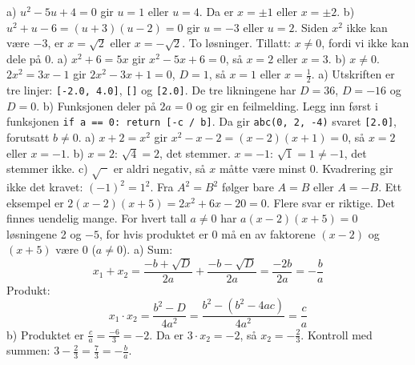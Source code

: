  a) $u^2 - 5u + 4 = 0$ gir $u = 1$ eller $u = 4$. Da er $x = \pm 1$ eller $x = \pm 2$.
b) $u^2 + u - 6 = (u+3)(u-2) = 0$ gir $u = -3$ eller $u = 2$. Siden $x^2$ ikke kan være $-3$, er $x = \sqrt{2}$ eller $x = -\sqrt{2}$. To løsninger.
 Tillatt: $x \neq 0$, fordi vi ikke kan dele på 0. a) $x^2 + 6 = 5x$ gir $x^2 - 5x + 6 = 0$, så $x = 2$ eller $x = 3$.
b) $x \neq 0$. $2x^2 = 3x - 1$ gir $2x^2 - 3x + 1 = 0$, $D = 1$, så $x = 1$ eller $x = \frac{1}{2}$.
 a) Utskriften er tre linjer: \lstinline[style=laereverk,numbers=none,frame=none]|[-2.0, 4.0]|, \lstinline[style=laereverk,numbers=none,frame=none]|[]| og \lstinline[style=laereverk,numbers=none,frame=none]|[2.0]|. De tre likningene har $D = 36$, $D = -16$ og $D = 0$.
b) Funksjonen deler på $2a = 0$ og gir en feilmelding. Legg inn først i funksjonen
\lstinline[style=laereverk,numbers=none,frame=none]|if a == 0: return [-c / b]|. Da gir \lstinline[style=laereverk,numbers=none,frame=none]|abc(0, 2, -4)| svaret \lstinline[style=laereverk,numbers=none,frame=none]|[2.0]|, forutsatt $b \neq 0$.
 a) $x + 2 = x^2$ gir $x^2 - x - 2 = (x-2)(x+1) = 0$, så $x = 2$ eller $x = -1$.
b) $x = 2$: $\sqrt{4} = 2$, det stemmer. $x = -1$: $\sqrt{1} = 1 \neq -1$, det stemmer ikke.
c) $\sqrt{\phantom{x}}$ er aldri negativ, så $x$ måtte være minst 0. Kvadrering gir ikke det kravet: $(-1)^2 = 1^2$. Fra $A^2 = B^2$ følger bare $A = B$ eller $A = -B$.
 Ett eksempel er $2(x-2)(x+5) = 2x^2 + 6x - 20 = 0$. Flere svar er riktige.
Det finnes uendelig mange. For hvert tall $a \neq 0$ har $a(x-2)(x+5) = 0$ løsningene 2 og $-5$, for hvis produktet er 0 må en av faktorene $(x-2)$ og $(x+5)$ være 0 ($a \neq 0$).
 a) Sum:
\[ x_1 + x_2 = \frac{-b + \sqrt{D}}{2a} + \frac{-b - \sqrt{D}}{2a} = \frac{-2b}{2a} = -\frac{b}{a} \]
Produkt:
\[ x_1 \cdot x_2 = \frac{b^2 - D}{4a^2} = \frac{b^2 - (b^2 - 4ac)}{4a^2} = \frac{c}{a} \]
b) Produktet er $\frac{c}{a} = \frac{-6}{3} = -2$. Da er $3 \cdot x_2 = -2$, så $x_2 = -\frac{2}{3}$.
Kontroll med summen: $3 - \frac{2}{3} = \frac{7}{3} = -\frac{b}{a}$.

